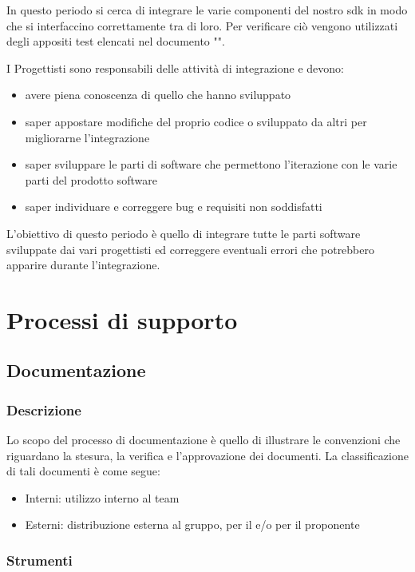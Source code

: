 In questo periodo si cerca di integrare le varie componenti del nostro sdk in modo che si interfaccino correttamente tra di loro.
Per verificare ciò vengono utilizzati degli appositi test elencati nel documento "\pianodiqualifica".

I Progettisti sono responsabili delle attività di integrazione e devono:
\begin{itemize}
	\item avere piena conoscenza di quello che hanno sviluppato
	\item saper appostare modifiche del proprio codice o sviluppato da altri per migliorarne l'integrazione
	\item saper sviluppare le parti di software che permettono l'iterazione con le varie parti del prodotto software
	\item saper individuare e correggere bug e requisiti non soddisfatti
\end{itemize}

L'obiettivo di questo periodo è quello di integrare tutte le parti software sviluppate dai vari progettisti ed correggere eventuali errori che potrebbero apparire durante l'integrazione.





\section{Processi di supporto}
\subsection{Documentazione}
\subsubsection{Descrizione }
Lo scopo del processo di documentazione è quello di illustrare le
convenzioni che riguardano la stesura, la verifica e l'approvazione
dei documenti. La classificazione di tali documenti è come segue: 
\begin{itemize} 
\item Interni: utilizzo interno al team
\item Esterni: distribuzione esterna al gruppo, per il  e/o per il proponente
\end{itemize}

\subsubsection{Strumenti}

